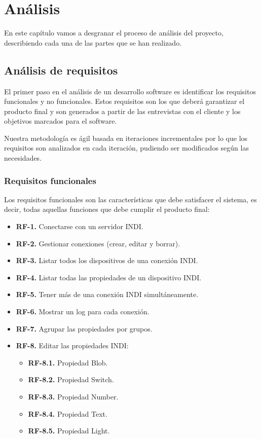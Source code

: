 \chapter{Análisis}

En este capítulo vamos a desgranar el proceso de análisis del proyecto, describiendo cada una de las partes que se han realizado.

\section{Análisis de requisitos}

El primer paso en el análisis de un desarrollo software es identificar los requisitos funcionales y no funcionales. Estos requisitos son los que deberá garantizar el producto final y son generados a partir de las entrevistas con el cliente y los objetivos marcados para el software.

\bigskip
Nuestra metodología es ágil basada en iteraciones incrementales por lo que los requisitos son analizados en cada iteración, pudiendo ser modificados según las necesidades.


\subsection{Requisitos funcionales}

Los requisitos funcionales son las características que debe satisfacer el sistema, es decir, todas aquellas funciones que debe cumplir el producto final:

\begin{itemize}
	\item \textbf{RF-1.} Conectarse con un servidor INDI.
	\item \textbf{RF-2.} Gestionar conexiones (crear, editar y borrar).
	\item \textbf{RF-3.} Listar todos los dispositivos de una conexión INDI.
	\item \textbf{RF-4.} Listar todas las propiedades de un dispositivo INDI.
	\item \textbf{RF-5.} Tener más de una conexión INDI simultáneamente.
	\item \textbf{RF-6.} Mostrar un log para cada conexión.
	\item \textbf{RF-7.} Agrupar las propiedades por grupos.
	\item \textbf{RF-8.} Editar las propiedades INDI:
		\begin{itemize}
			\item \textbf{RF-8.1.} Propiedad Blob.
			\item \textbf{RF-8.2.} Propiedad Switch.
			\item \textbf{RF-8.3.} Propiedad Number.
			\item \textbf{RF-8.4.} Propiedad Text.
			\item \textbf{RF-8.5.} Propiedad Light.
		\end{itemize}
\end{itemize}

